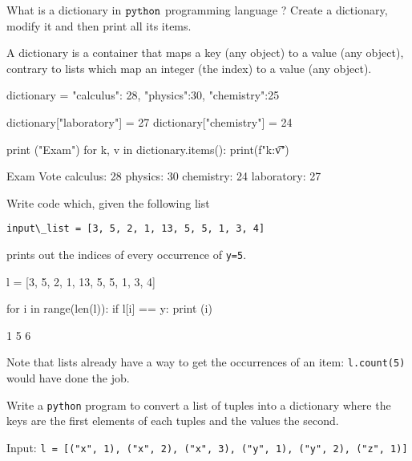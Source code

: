 \begin{question}
What is a dictionary in \(\tt{python}\) programming language ? Create a dictionary, modify it and then print all its items.
\end{question}

\cprotEnv\begin{solution}
A dictionary is a container that maps a key (any object) to a value (any object), contrary to lists which map an integer (the index) to a value (any object).

\begin{ipython}
dictionary = {"calculus": 28, "physics":30, "chemistry":25}

dictionary["laboratory"] = 27
dictionary["chemistry"] = 24

print ("Exam\tVote")
for k, v in dictionary.items():
    print(f"{k}:\t{v}")
\end{ipython}
\begin{ioutput}
Exam            Vote
calculus:       28
physics:        30
chemistry:      24
laboratory:     27
\end{ioutput}
\end{solution}

\begin{question}
Write code which, given the following list 

\lstinline[language=iPython]|input\_list = [3, 5, 2, 1, 13, 5, 5, 1, 3, 4]|

\noindent
prints out the indices of every occurrence of \lstinline[language=iPython]|y=5|.
\end{question}

\cprotEnv\begin{solution}
\begin{ipython}
l = [3, 5, 2, 1, 13, 5, 5, 1, 3, 4]

for i in range(len(l)):
    if l[i] == y:
        print (i)
\end{ipython}
\begin{ioutput}
1
5
6
\end{ioutput}
Note that lists already have a way to get the occurrences of an item: \texttt{l.count(5)} would have done the job.
\end{solution}

\begin{question}
Write a \texttt{python} program to convert a list of tuples into a dictionary where the keys are the first elements of each tuples and the values the second.

\noindent
Input: \lstinline[language=iPython]|l = [("x", 1), ("x", 2), ("x", 3), ("y", 1), ("y", 2), ("z", 1)]|
\end{question}

